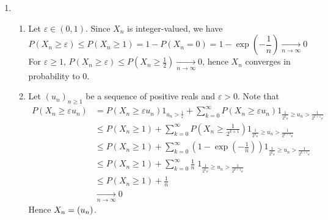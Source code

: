 \documentclass[a4paper,11pt]{article}
\let\o\relax
\DeclareMathOperator*{\o}{\mathit o_{\mathbb P}}
\begin{document}
\begin{enumerate}
  \item 
  \begin{enumerate}
    \item Let $\varepsilon \in (0,1)$. Since $X_n$ is integer-valued, we have $$P(X_n\geq \varepsilon) \leq P(X_n\geq 1) = 1-P(X_n=0) = 1-\exp(-\frac 1n) \xrightarrow[n\to \infty]{} 0$$
    For $\varepsilon \geq 1$, $P(X_n\geq \varepsilon) \leq P(X_n\geq \frac 12) \xrightarrow[n\to \infty]{} 0$, hence $X_n$ converges in probability to $0$.
    \item Let $(u_n)_{n\geq 1}$ be a sequence of positive reals and $\varepsilon >0$. Note that 
    $$\begin{aligned}
      P(X_n\geq \varepsilon u_n) &= P(X_n\geq \varepsilon u_n) 1_{u_n>\frac{1}{\varepsilon}} + \sum_{k=0}^\infty P(X_n\geq \varepsilon u_n) 1_{\frac{1}{2^k \varepsilon} \geq u_n>\frac{1}{2^{k+1} \varepsilon}}\\
      &\leq P(X_n\geq 1) + \sum_{k=0}^\infty P\left(X_n\geq \frac{1}{2^{k+1}}\right) 1_{\frac{1}{2^k \varepsilon} \geq u_n>\frac{1}{2^{k+1} \varepsilon}}\\
      &\leq P(X_n\geq 1) + \sum_{k=0}^\infty \left(1-\exp(-\frac 1n)\right) 1_{\frac{1}{2^k \varepsilon} \geq u_n>\frac{1}{2^{k+1} \varepsilon}}\\
      &\leq P(X_n\geq 1) + \sum_{k=0}^\infty \frac 1n \; 1_{\frac{1}{2^k \varepsilon} \geq u_n>\frac{1}{2^{k+1} \varepsilon}}\\
      &\leq P(X_n\geq 1) + \frac 1n\\
      &\xrightarrow[n\to \infty]{} 0
    \end{aligned}$$
    Hence $X_n=\o(u_n)$.


\end{enumerate}
\end{enumerate}
\end{document}
